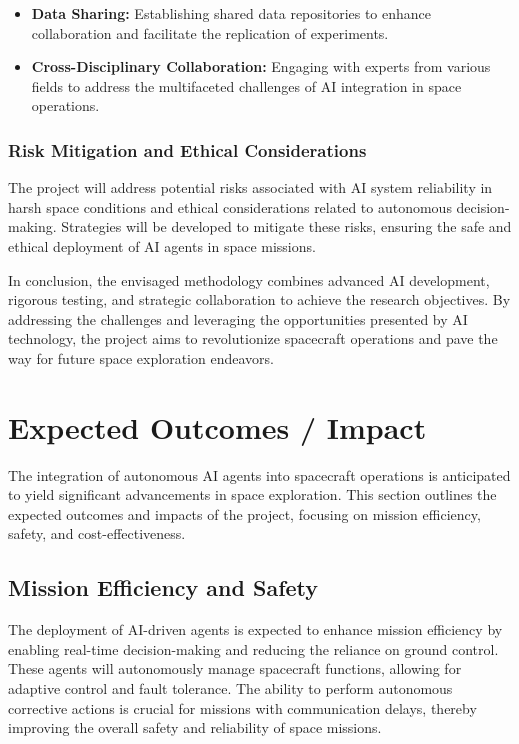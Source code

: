 \documentclass[a4paper, 11pt]{article}
\begin{document}
\begin{itemize}
    \item \textbf{Data Sharing:} Establishing shared data repositories to enhance collaboration and facilitate the replication of experiments.
    \item \textbf{Cross-Disciplinary Collaboration:} Engaging with experts from various fields to address the multifaceted challenges of AI integration in space operations.
\end{itemize}

\subsubsection{Risk Mitigation and Ethical Considerations}

The project will address potential risks associated with AI system reliability in harsh space conditions and ethical considerations related to autonomous decision-making. Strategies will be developed to mitigate these risks, ensuring the safe and ethical deployment of AI agents in space missions.

In conclusion, the envisaged methodology combines advanced AI development, rigorous testing, and strategic collaboration to achieve the research objectives. By addressing the challenges and leveraging the opportunities presented by AI technology, the project aims to revolutionize spacecraft operations and pave the way for future space exploration endeavors.
\section{Expected Outcomes / Impact}

The integration of autonomous AI agents into spacecraft operations is anticipated to yield significant advancements in space exploration. This section outlines the expected outcomes and impacts of the project, focusing on mission efficiency, safety, and cost-effectiveness.

\subsection{Mission Efficiency and Safety}

The deployment of AI-driven agents is expected to enhance mission efficiency by enabling real-time decision-making and reducing the reliance on ground control. These agents will autonomously manage spacecraft functions, allowing for adaptive control and fault tolerance. The ability to perform autonomous corrective actions is crucial for missions with communication delays, thereby improving the overall safety and reliability of space missions.
\end{document}
